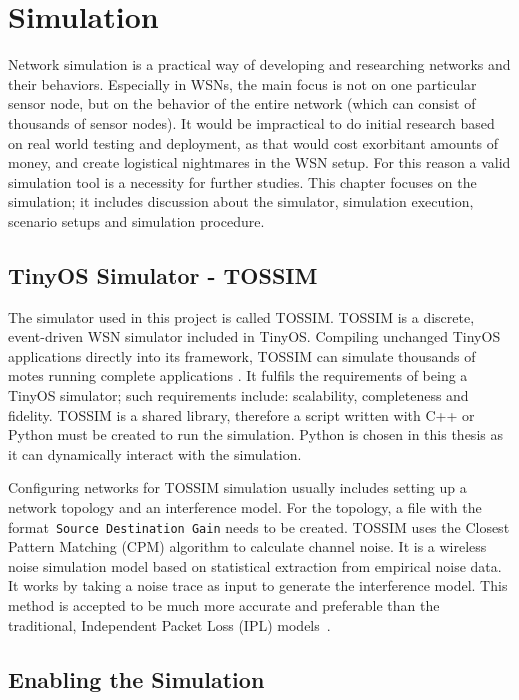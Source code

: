 \chapter{Simulation}
\label{Sim}
Network simulation is a practical way of developing and researching networks and their
behaviors. Especially in WSNs, the main focus is not on one particular sensor node, but on
the behavior of the entire network (which can consist of thousands of sensor nodes). It would
be impractical to do initial research based on real world testing and deployment, as that would cost exorbitant amounts of money, and create logistical nightmares in the WSN setup. For this reason a valid
simulation tool is a necessity for further studies. This chapter focuses on the simulation; it 
includes discussion about the simulator, simulation execution, scenario setups and simulation procedure.

\section{TinyOS Simulator - TOSSIM}
\label{Sim:TOSSIM}

The simulator used in this project is called TOSSIM\@. TOSSIM is a discrete, event-driven WSN simulator included in TinyOS. Compiling unchanged TinyOS applications
directly into its framework, TOSSIM can simulate thousands of motes running complete
applications \cite{LLWC}. It fulfils the requirements of being a TinyOS simulator; such requirements include: scalability, completeness and fidelity. TOSSIM is a shared library, therefore a script written with C++ or Python must be created to run the simulation.  Python is chosen in this thesis as it can dynamically interact with the simulation.

Configuring networks for TOSSIM simulation usually includes setting
up a network topology and an interference model. For the topology, a file with the format~\texttt{Source Destination Gain} needs to be created. TOSSIM uses the Closest Pattern Matching (CPM) algorithm to calculate channel noise. It is a wireless noise simulation model
based on statistical extraction from empirical noise data. It works by taking a noise trace as input to generate the interference model. This method is accepted to be much more accurate and preferable than the traditional, Independent Packet Loss (IPL) models~\cite{TOSSIM}.

\section{Enabling the Simulation}
\label{Sim:Enabling}

